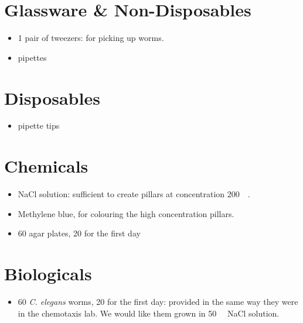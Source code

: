 \documentclass[11pt]{article}
\title{\vspace{-1em}{\underline{Independent Laboratory: Materials List}}\vspace{-.5em}}
\author{Benjamin Huang \& Shiye Su}
\date{}
\begin{document}
\maketitle

\section{Glassware \& Non-Disposables}

\begin{itemize}

	\item 1 pair of tweezers: for picking up worms.

	\item pipettes
	
\end{itemize}


\section{Disposables}

\begin{itemize}
	
	\item pipette tips

\end{itemize}

\section{Chemicals}

\begin{itemize}
	
	\item NaCl solution: sufficient to create pillars at concentration \SI{200}{\milli \molar}.

	\item Methylene blue, for colouring the high concentration pillars.

	\item 60 agar plates, 20 for the first day
		
\end{itemize}


\section{Biologicals}

\begin{itemize}

	\item 60 \emph{C. elegans} worms, 20 for the first day: provided in the same way they were in the chemotaxis lab. We would like them grown in \SI{50}{\milli \molar} NaCl solution. 
	
\end{itemize}
\end{document}
